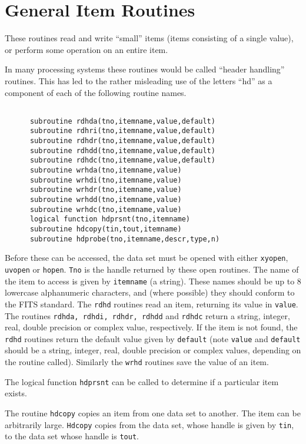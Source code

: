 \section{General Item Routines}
These routines read and write ``small'' items (items consisting of a single
value), or perform some operation on an entire item.

In many processing systems these routines would be called ``header handling''
routines. This has led to the rather misleading use of the
letters ``hd'' as a component of each of the following routine names.
\begin{verbatim}

      subroutine rdhda(tno,itemname,value,default)
      subroutine rdhri(tno,itemname,value,default)
      subroutine rdhdr(tno,itemname,value,default)
      subroutine rdhdd(tno,itemname,value,default)
      subroutine rdhdc(tno,itemname,value,default)
      subroutine wrhda(tno,itemname,value)
      subroutine wrhdi(tno,itemname,value)
      subroutine wrhdr(tno,itemname,value)
      subroutine wrhdd(tno,itemname,value)
      subroutine wrhdc(tno,itemname,value)
      logical function hdprsnt(tno,itemname)
      subroutine hdcopy(tin,tout,itemname)
      subroutine hdprobe(tno,itemname,descr,type,n)

\end{verbatim}
Before these can be accessed, the data set must be
opened with either {\tt xyopen}, {\tt uvopen} or {\tt hopen}. {\tt Tno} is the
handle returned by these open routines.
The name of the item to access is given by {\tt itemname} (a string).
These names should be up to 8 lowercase alphanumeric
characters, and (where possible) they should conform to the FITS standard.
The {\tt rdhd} routines read an item, returning its value in {\tt value}.
The routines {\tt rdhda, rdhdi, rdhdr, rdhdd} and {\tt rdhdc} return a string,
integer, real, double precision or complex value, respectively. If the item
is not found, the {\tt rdhd} routines return the default value given
by {\tt default} (note {\tt value} and {\tt default} should be a string,
integer, real, double precision or complex values, depending on the routine
called). Similarly
the {\tt wrhd} routines save the value of an item.

The logical function {\tt hdprsnt} can be called to determine if a
particular item exists.

The routine {\tt hdcopy} copies an item from one data set to another.
The item can be
arbitrarily large. {\tt Hdcopy} copies from the data set, whose handle
is given by {\tt tin}, to the data set whose handle is {\tt tout}.

